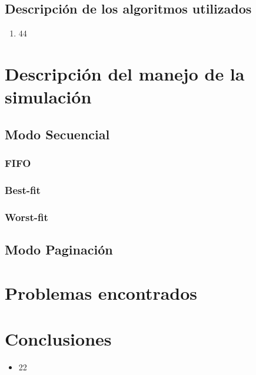 \documentclass[10pt,a4paper]{article}
\begin{document}
\subsection{Descripción de los algoritmos utilizados}
\begin{enumerate}
\item 44
\end{enumerate}
\section{Descripción del manejo de la simulación}
\subsection{Modo Secuencial}
\subsubsection{FIFO}
\subsubsection{Best-fit}
\subsubsection{Worst-fit}
\subsection{Modo Paginación}
\section{Problemas encontrados}
\section{Conclusiones}
\begin{itemize}
\item 22
\end{itemize}
\end{document}
